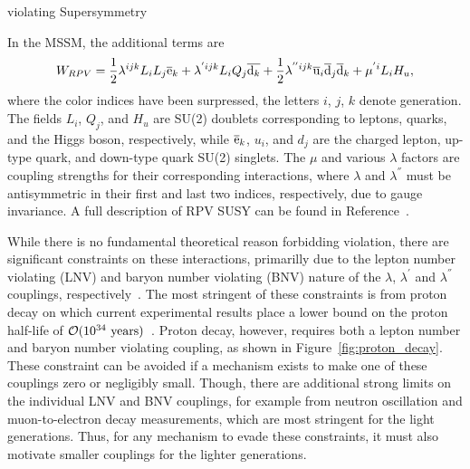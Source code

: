 \begin{section}{\RP violating Supersymmetry}

In the MSSM, the additional \RPV terms are
\begin{align}
W_{RPV} = \frac{1}{2}\lambda^{ijk}L_{i}L_{j}\overline{\mathrm{e}}_{k} + \lambda^{'ijk}L_{i}Q_{j}\overline{\mathrm{d}_{k}} + \frac{1}{2}\lambda^{''ijk}\overline{\mathrm{u}}_{i}\overline{\mathrm{d}}_{j}\overline{\mathrm{d}}_{k} + \mu^{'i}L_{i}H_{u},
\end{align}
where the color indices have been surpressed, the letters $i$, $j$, $k$ denote generation.
The fields $L_{i}$, $Q_{j}$, and $H_u$ are SU(2) doublets corresponding to leptons, quarks, and the Higgs boson, respectively, while $\overline{\mathrm{e}}_k$, $u_i$, and $d_j$ are the charged lepton, up-type quark, and down-type quark SU(2) singlets.
The $\mu$ and various $\lambda$ factors are coupling strengths for their corresponding interactions, where $\lambda$ and $\lambda^{''}$ must be antisymmetric in their first and last two indices, respectively, due to gauge invariance.
A full description of RPV SUSY can be found in Reference~\cite{Barbier:2004ez}.

While there is no fundamental theoretical reason forbidding \RP violation, there are significant constraints on these interactions, primarilly due to the lepton number violating (LNV) and baryon number violating (BNV) nature of the $\lambda$, $\lambda^{'}$ and $\lambda^{''}$ couplings, respectively~\cite{Allanach:1999ic}.
The most stringent of these constraints is from proton decay on which current experimental results place a lower bound on the proton half-life of $\mathcal{O}(10^{34}\ \mathrm{years})$~\cite{Bajc:2016qcc,Nishino:2009aa}.
Proton decay, however, requires both a lepton number and baryon number violating coupling, as shown in Figure~\ref{fig:proton_decay}.
These constraint can be avoided if a mechanism exists to make one of these couplings zero or negligibly small.
Though, there are additional strong limits on the individual LNV and BNV couplings, for example from neutron oscillation and muon-to-electron decay measurements, which are most stringent for the light generations.
Thus, for any mechanism to evade these constraints, it must also motivate smaller couplings for the lighter generations.


\end{section}
